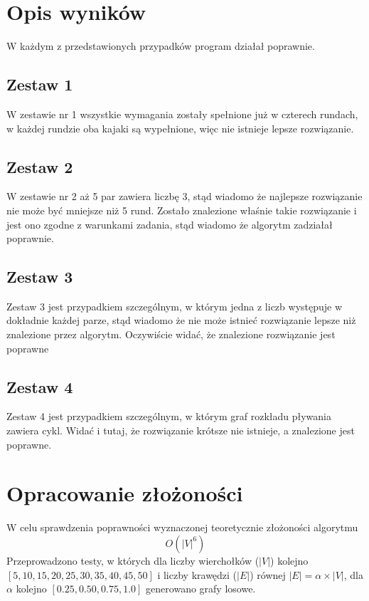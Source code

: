 \documentclass{llncs}
\begin{document}
\section{Opis wyników}
W każdym z przedstawionych przypadków program działał poprawnie. 

\subsection{Zestaw 1}
W zestawie nr 1 wszystkie wymagania zostały spełnione już w czterech rundach, w każdej rundzie oba kajaki są wypełnione, więc nie istnieje lepsze rozwiązanie.

\subsection{Zestaw 2}
W zestawie nr 2 aż 5 par zawiera liczbę 3, stąd wiadomo że najlepsze rozwiązanie nie może być mniejsze niż 5 rund. Zostało znalezione właśnie takie rozwiązanie i jest ono zgodne z warunkami zadania, stąd wiadomo że algorytm zadziałał poprawnie.

\subsection{Zestaw 3}
Zestaw 3 jest przypadkiem szczególnym, w którym jedna z liczb występuje w dokładnie każdej parze, stąd wiadomo że nie może istnieć rozwiązanie lepsze niż znalezione przez algorytm. Oczywiście widać, że znalezione rozwiązanie jest poprawne

\subsection{Zestaw 4}
Zestaw 4 jest przypadkiem szczególnym, w którym graf rozkładu pływania zawiera cykl. Widać i tutaj, że rozwiązanie krótsze nie istnieje, a znalezione jest poprawne.

\section{Opracowanie złożoności}
W celu sprawdzenia poprawności wyznaczonej teoretycznie złożoności algorytmu
\begin{equation}
O(|V|^6)
\end{equation}
Przeprowadzono testy, w których dla liczby wierchołków ($|V|$) kolejno $[5, 10, 15, 20, 25, 30, 35, 40, 45, 50]$ i liczby krawędzi ($|E|$) równej $|E|=\alpha\times|V|$, dla $\alpha$ kolejno $[0.25, 0.50, 0.75, 1.0]$ generowano grafy losowe. 
\end{document}
